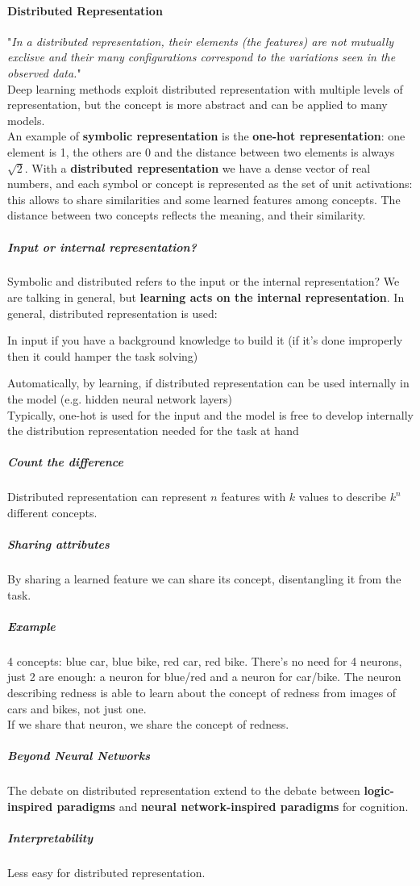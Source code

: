 \documentclass[10pt]{report}
\begin{document}
\paragraph{Distributed Representation} "\textit{In a distributed representation, their elements (the features) are not mutually exclisve and their many configurations correspond to the variations seen in the observed data.}"\\
Deep learning methods exploit distributed representation with multiple levels of representation, but the concept is more abstract and can be applied to many models.\\
An example of \textbf{symbolic representation} is the \textbf{one-hot representation}: one element is 1, the others are 0 and the distance between two elements is always $\sqrt{2}$. With a \textbf{distributed representation} we have a dense vector of real numbers, and each symbol or concept is represented as the set of unit activations: this allows to share similarities and some learned features among concepts. The distance between two concepts reflects the meaning, and their similarity.
\subparagraph{Input or internal representation?} Symbolic and distributed refers to the input or the internal representation? We are talking in general, but \textbf{learning acts on the internal representation}. In general, distributed representation is used:
\begin{list}{}{}
	\item In input if you have a background knowledge to build it (if it's done improperly then it could hamper the task solving)
	\item Automatically, by learning, if distributed representation can be used internally in the model (e.g. hidden neural network layers)\\
	Typically, one-hot is used for the input and the model is free to develop internally the distribution representation needed for the task at hand
\end{list}
\subparagraph{Count the difference} Distributed representation can represent $n$ features with $k$ values to describe $k^n$ different concepts.
\subparagraph{Sharing attributes} By sharing a learned feature we can share its concept, disentangling it from the task.
\subparagraph{Example} 4 concepts: blue car, blue bike, red car, red bike. There's no need for 4 neurons, just 2 are enough: a neuron for blue/red and a neuron for car/bike. The neuron describing redness is able to learn about the concept of redness from images of cars and bikes, not just one.\\
If we share that neuron, we share the concept of redness.
\subparagraph{Beyond Neural Networks} The debate on distributed representation extend to the debate between \textbf{logic-inspired paradigms} and \textbf{neural network-inspired paradigms} for cognition.
\subparagraph{Interpretability} Less easy for distributed representation.
\end{document}
